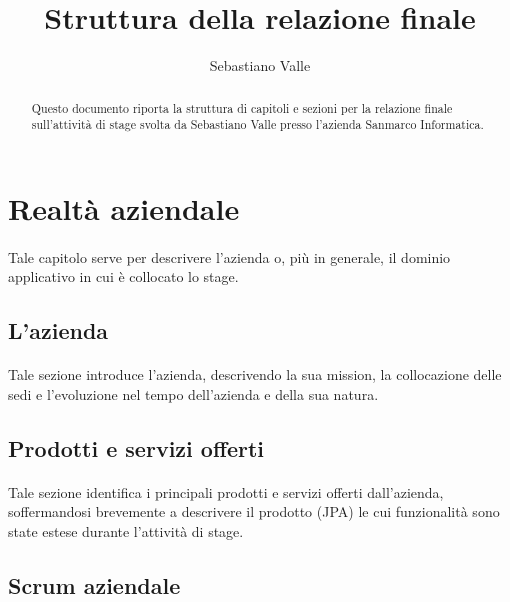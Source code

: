 \documentclass[
article,
10pt, %
oneside, %
BCOR5mm, %
]{scrartcl}
\begin{document}
\title{Struttura della relazione finale}
\author{Sebastiano Valle}

\maketitle

\begin{abstract}
Questo documento riporta la struttura di capitoli e sezioni per la relazione
finale sull'attività di stage svolta da Sebastiano Valle presso l'azienda
Sanmarco Informatica.
\end{abstract}

\section{Realtà aziendale} %

\paragraph{} Tale capitolo serve per descrivere l'azienda o, più in generale,
il dominio applicativo in cui è collocato lo stage.

\subsection{L'azienda} %

\paragraph{} Tale sezione introduce l'azienda, descrivendo la sua mission,
la collocazione delle sedi e l'evoluzione nel tempo dell'azienda e della sua
natura.

\subsection{Prodotti e servizi offerti}\label{sec:realta-prod}

\paragraph{} Tale sezione identifica i principali prodotti e servizi offerti
dall'azienda, soffermandosi brevemente a descrivere il prodotto (JPA) le cui
funzionalità sono state estese durante l'attività di stage.

\subsection{Scrum aziendale}
\end{document}
